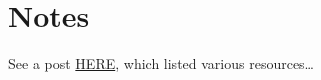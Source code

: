 \section{Notes}

See a post \href{https://math.stackexchange.com/questions/1678780/hartshorne-or-vakils-notes}{HERE}, which listed various resources\dots